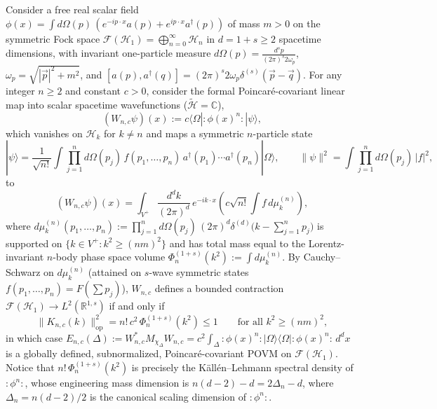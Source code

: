 \documentclass[11pt,a4paper]{article}
\theoremstyle{definition}
\theoremstyle{remark}
\newcommand{\HH}{\mathcal{H}}
\newcommand{\tH}{\widetilde{\mathcal{H}}}
\newcommand{\RR}{\mathbb{R}}
\newcommand{\CC}{\mathbb{C}}
\newcommand{\op}{\mathrm{op}}
\newcommand{\ket}[1]{|#1\rangle}
\newcommand{\bra}[1]{\langle #1|}
\newcommand{\norm}[1]{\|#1\|}
\begin{document}
Consider a free real scalar field $\phi(x) = \int d\Omega(p)\,(e^{-ip\cdot x}a(p) + e^{ip\cdot x}a^\dagger(p))$ of mass $m>0$ on the symmetric Fock space $\mathcal{F}(\HH_1)=\bigoplus_{n=0}^\infty \HH_n$ in $d=1+s\ge 2$ spacetime dimensions, with invariant one-particle measure $d\Omega(p)=\frac{d^sp}{(2\pi)^s 2\omega_p}$, $\omega_p=\sqrt{|\vec{p}|^2+m^2}$, and $[a(p),a^\dagger(q)]=(2\pi)^s 2\omega_p\delta^{(s)}(\vec{p}-\vec{q})$. For any integer $n\ge 2$ and constant $c>0$, consider the formal Poincar\'e-covariant linear map into scalar spacetime wavefunctions ($\tH=\CC$),
\begin{equation}\label{eq:Wick-W}
(W_{n,c}\psi)(x) := c\bra{\Omega}:\!\phi(x)^n\!:\ket{\psi},
\end{equation}
which vanishes on $\HH_k$ for $k\neq n$ and maps a symmetric $n$-particle state
\[
\ket{\psi} = \frac{1}{\sqrt{n!}}\int \prod_{j=1}^n d\Omega(p_j)\,f(p_1,\dots,p_n)\,a^\dagger(p_1)\cdots a^\dagger(p_n)\ket{\Omega},
\qquad \norm{\psi}^2 = \int \prod_{j=1}^n d\Omega(p_j)\,|f|^2,
\]
to
\begin{equation}\label{eq:Wick-FT}
(W_{n,c}\psi)(x) = \int_{V^+} \frac{d^dk}{(2\pi)^d}\,e^{-ik\cdot x}\left(c\sqrt{n!}\int f\,d\mu_k^{(n)}\right),
\end{equation}
where $d\mu_k^{(n)}(p_1,\dots,p_n):=\prod_{j=1}^n d\Omega(p_j)\,(2\pi)^d\delta^{(d)}\!\bigl(k-\sum_{j=1}^n p_j\bigr)$ is supported on $\{k\in V^+: k^2\ge (nm)^2\}$ and has total mass equal to the Lorentz-invariant $n$-body phase space volume $\Phi_n^{(1+s)}(k^2):=\int d\mu_k^{(n)}$. By Cauchy--Schwarz on $d\mu_k^{(n)}$ (attained on $s$-wave symmetric states $f(p_1,\dots,p_n)=F(\sum p_j)$), $W_{n,c}$ defines a bounded contraction $\mathcal{F}(\HH_1)\to L^2(\RR^{1,s})$ if and only if
\begin{equation}\label{eq:Wick-norm}
\norm{K_{n,c}(k)}_{\op}^2 = n!\,c^2\,\Phi_n^{(1+s)}(k^2) \le 1 \qquad \text{for all } k^2 \ge (nm)^2,
\end{equation}
in which case $E_{n,c}(\Delta) := W_{n,c}^* M_{\chi_\Delta} W_{n,c} = c^2\int_\Delta :\!\phi(x)^n\!:\ket{\Omega}\bra{\Omega}:\!\phi(x)^n\!:\,d^dx$ is a globally defined, subnormalized, Poincar\'e-covariant POVM on $\mathcal{F}(\HH_1)$. Notice that $n!\,\Phi_n^{(1+s)}(k^2)$ is precisely the K\"all\'en--Lehmann spectral density of $:\!\phi^n\!:$, whose engineering mass dimension is $n(d-2)-d = 2\Delta_n - d$, where $\Delta_n = n(d-2)/2$ is the canonical scaling dimension of $:\!\phi^n\!:$.
\end{document}
